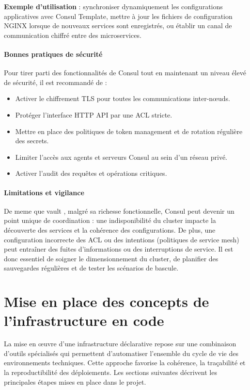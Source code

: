 \textbf{Exemple d’utilisation} : synchroniser dynamiquement les configurations applicatives avec Consul Template, mettre à jour les fichiers de configuration NGINX lorsque de nouveaux services sont enregistrés, ou établir un canal de communication chiffré entre des microservices.

\paragraph{Bonnes pratiques de sécurité}

Pour tirer parti des fonctionnalités de Consul tout en maintenant un niveau élevé de sécurité, il est recommandé de :
\begin{itemize}
	\item Activer le chiffrement TLS pour toutes les communications inter-nœuds.
	\item Protéger l’interface HTTP API par une ACL stricte.
	\item Mettre en place des politiques de token management et de rotation régulière des secrets.
	\item Limiter l’accès aux agents et serveurs Consul au sein d’un réseau privé.
	\item Activer l’audit des requêtes et opérations critiques.
\end{itemize}

\paragraph{Limitations et vigilance}

De meme que vault , malgré sa richesse fonctionnelle, Consul peut devenir un point unique de coordination : une indisponibilité du cluster impacte la découverte des services et la cohérence des configurations. De plus, une configuration incorrecte des ACL ou des intentions (politiques de service mesh) peut entraîner des fuites d’informations ou des interruptions de service. Il est donc essentiel de soigner le dimensionnement du cluster, de planifier des sauvegardes régulières et de tester les scénarios de bascule.

\section{Mise en place des concepts de l'infrastructure en code}

La mise en œuvre d'une infrastructure déclarative repose sur une combinaison d'outils spécialisés qui permettent d'automatiser l'ensemble du cycle de vie des environnements techniques. Cette approche favorise la cohérence, la traçabilité et la reproductibilité des déploiements.
Les sections suivantes décrivent les principales étapes mises en place dans le projet.


